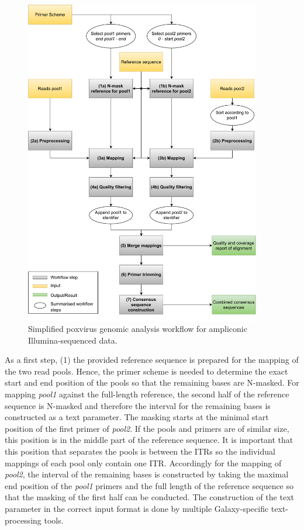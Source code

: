 \begin{figure}[ht!]
	\includegraphics[width=0.92\textwidth]{media/3-pox.pdf}
	\caption{Simplified poxvirus genomic analysis workflow for ampliconic Illumina-sequenced data.}
	\label{fig:3-pox-wf}
\end{figure}
As a first step, (1) the provided reference sequence is prepared for the mapping of the two read pools. Hence, the primer scheme is needed to determine the exact start and end position of the pools so that the remaining bases are N-masked. For mapping \textit{pool1} against the full-length reference, the second half of the reference sequence is N-masked and therefore the interval for the remaining bases is constructed as a text parameter. The masking starts at the minimal start position of the first primer of \textit{pool2}. If the pools and primers are of similar size, this position is in the middle part of the reference sequence. It is important that this position that separates the pools is between the \acp{ITR} so the individual mappings of each pool only contain one \ac{ITR}. Accordingly for the mapping of \textit{pool2}, the interval of the remaining bases is constructed by taking the maximal end position of the \textit{pool1} primers and the full length of the reference sequence so that the masking of the first half can be conducted. The construction of the text parameter in the correct input format is done by multiple Galaxy-specific text-processing tools.\\%
